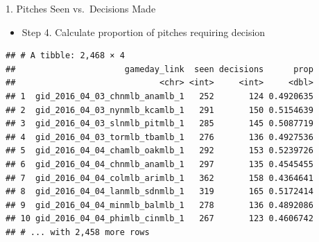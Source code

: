 \documentclass[14pt,ignorenonframetext,aspectratio = 1610]{beamer}
\newenvironment{Shaded}{\begin{snugshade}}{\end{snugshade}}
\newcommand{\KeywordTok}[1]{\textcolor[rgb]{0.13,0.29,0.53}{\textbf{{#1}}}}
\newcommand{\DataTypeTok}[1]{\textcolor[rgb]{0.13,0.29,0.53}{{#1}}}
\newcommand{\StringTok}[1]{\textcolor[rgb]{0.31,0.60,0.02}{{#1}}}
\newcommand{\NormalTok}[1]{{#1}}
\providecommand{\tightlist}{%
\setlength{\itemsep}{0pt}\setlength{\parskip}{0pt}}
\begin{document}
\begin{frame}[fragile]{1. Pitches Seen vs.~Decisions Made}

\begin{itemize}
\tightlist
\item
  Step 4. Calculate proportion of pitches requiring decision
\end{itemize}

\footnotesize

\begin{Shaded}
\end{Shaded}

\begin{verbatim}
## # A tibble: 2,468 × 4
##                      gameday_link  seen decisions      prop
##                             <chr> <int>     <int>     <dbl>
## 1  gid_2016_04_03_chnmlb_anamlb_1   252       124 0.4920635
## 2  gid_2016_04_03_nynmlb_kcamlb_1   291       150 0.5154639
## 3  gid_2016_04_03_slnmlb_pitmlb_1   285       145 0.5087719
## 4  gid_2016_04_03_tormlb_tbamlb_1   276       136 0.4927536
## 5  gid_2016_04_04_chamlb_oakmlb_1   292       153 0.5239726
## 6  gid_2016_04_04_chnmlb_anamlb_1   297       135 0.4545455
## 7  gid_2016_04_04_colmlb_arimlb_1   362       158 0.4364641
## 8  gid_2016_04_04_lanmlb_sdnmlb_1   319       165 0.5172414
## 9  gid_2016_04_04_minmlb_balmlb_1   278       136 0.4892086
## 10 gid_2016_04_04_phimlb_cinmlb_1   267       123 0.4606742
## # ... with 2,458 more rows
\end{verbatim}

\end{frame}
\end{document}
